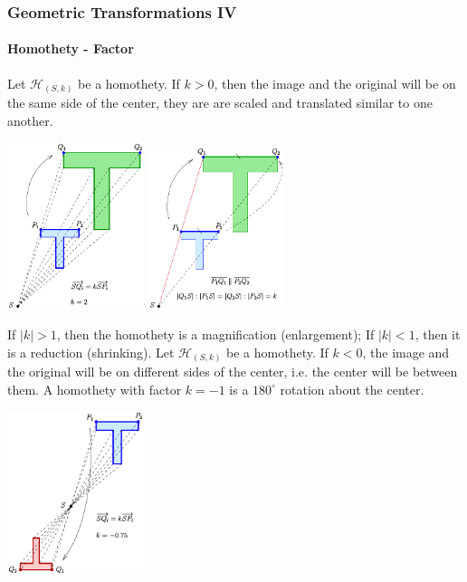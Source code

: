 \documentclass[8pt,xcolor=table,dvipsnames]{beamer}
\begin{document}
\begin{frame}[t]
    \frametitle{Geometric Transformations IV}
    \framesubtitle{Homothety - Factor}
    \begin{overprint}
        Let $\mathcal{H}_{(S, k)}$ be a homothety.
        \bigbreak
        If $k > 0$, then the image and the original will be on the same side of the center,
        they are are scaled and translated similar to one another.
        \begin{center}
            \includegraphics[width=4cm]{./svg/pdf/Zentr-streck-T-e.pdf}
            \qquad
            \includegraphics[width=4cm]{./svg/pdf/Zentr-streck-T-S-e.pdf}
        \end{center}
        If $|k| > 1$, then the homothety is a magnification (enlargement);
        If $|k| < 1$, then it is a reduction (shrinking).
        Let $\mathcal{H}_{(S, k)}$ be a homothety.
        \bigbreak
        If $k < 0$, the image and the original will be on different sides of the center,
        i.e. the center will be between them. 
        A homothety with factor $k=-1$ is a $180^\circ$ rotation about the center.
        \begin{center}
            \includegraphics[width=4cm]{./svg/pdf/Zentr-streck-T-nk-e.pdf}

\end{center}
\end{overprint}
\end{frame}
\end{document}
